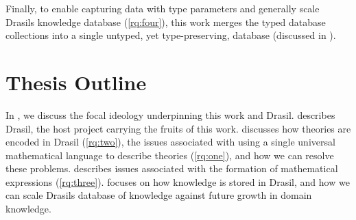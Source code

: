 Finally, to enable capturing data with type parameters and generally scale
Drasils knowledge database (\ref{rq:four}), this work merges the typed database
collections into a single untyped, yet type-preserving, database (discussed in
).


\section{Thesis Outline}
\label{sec:intro:outline}

In , we discuss the focal ideology underpinning this work
and Drasil.  describes Drasil, the host project carrying the
fruits of this work.  discusses how theories are encoded
in Drasil (\ref{rq:two}), the issues associated with using a single universal
mathematical language to describe theories (\ref{rq:one}), and how we can
resolve these problems.  describes issues associated with
the formation of mathematical expressions (\ref{rq:three}).
 focuses on how knowledge is stored in Drasil, and how
we can scale Drasils database of knowledge against future growth in domain
knowledge.
